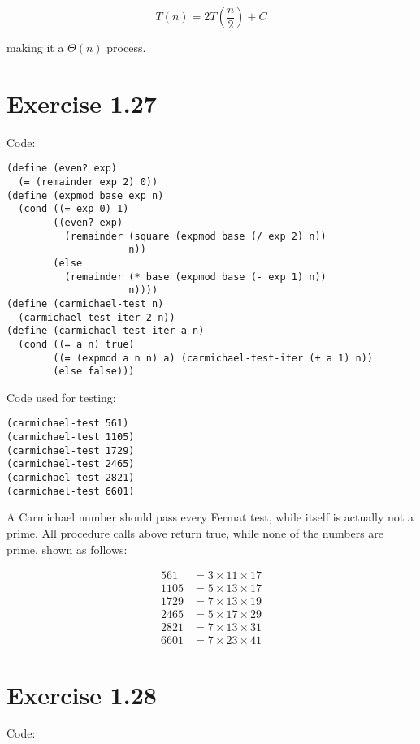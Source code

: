 \documentclass[../main.tex]{subfiles}
\begin{document}
$$
T(n) = 2T\left(\frac{n}{2}\right) + C
$$

making it a $\Theta(n)$ process.

\section{Exercise 1.27}

Code:

\begin{lstlisting}
(define (even? exp)
  (= (remainder exp 2) 0))
(define (expmod base exp n)
  (cond ((= exp 0) 1)
        ((even? exp)
          (remainder (square (expmod base (/ exp 2) n)) 
                     n))
        (else
          (remainder (* base (expmod base (- exp 1) n))
                     n))))
(define (carmichael-test n)
  (carmichael-test-iter 2 n))
(define (carmichael-test-iter a n)
  (cond ((= a n) true)
        ((= (expmod a n n) a) (carmichael-test-iter (+ a 1) n))
        (else false)))
\end{lstlisting}

Code used for testing:

\begin{lstlisting}
(carmichael-test 561)
(carmichael-test 1105)
(carmichael-test 1729)
(carmichael-test 2465)
(carmichael-test 2821)
(carmichael-test 6601)
\end{lstlisting}

A Carmichael number should pass every Fermat test, while
 itself is actually not a prime. All procedure calls above
 return true, while none of the numbers are prime, shown
 as follows:

\begin{align*}
561 &= 3 \times 11 \times 17 \\
1105 &= 5 \times 13 \times 17 \\
1729 &= 7 \times 13 \times 19 \\
2465 &= 5 \times 17 \times 29 \\
2821 &= 7 \times 13 \times 31 \\
6601 &= 7 \times 23 \times 41
\end{align*}

\section{Exercise 1.28}

Code:
\end{document}
